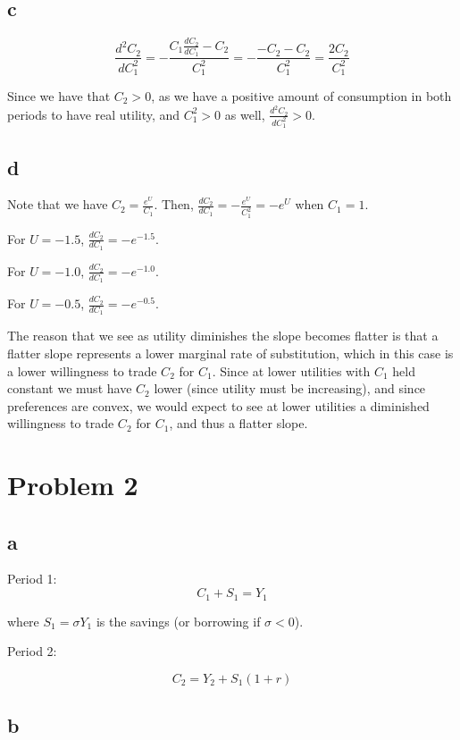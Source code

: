 \documentclass[12pt,letterpaper]{article}
\theoremstyle{definition}
\begin{document}
\subsection*{c}

\[
  \frac{d^2C_2}{dC_1^2} = -\frac{C_1\frac{dC_2}{dC_1} - C_2}{C_1^2} =
  -\frac{-C_2 - C_2}{C_1^2} = \frac{2C_2}{C_1^2}
\]

Since we have that $C_2 > 0$, as we have a positive amount of consumption in
both periods to have real utility, and $C_1^2 > 0$ as well,
$\frac{d^2C_2}{dC_1^2} > 0$.

\subsection*{d}

Note that we have $C_2 = \frac{e^{U}}{C_1}$. Then, $\frac{dC_2}{dC_1} =
-\frac{e^U}{C_1^2} = -e^U$ when $C_1 = 1$.

For $U = -1.5$, $\frac{dC_2}{dC_1} = -e^{-1.5}$.

For $U = -1.0$, $\frac{dC_2}{dC_1} = -e^{-1.0}$.

For $U = -0.5$, $\frac{dC_2}{dC_1} = -e^{-0.5}$.

The reason that we see as utility diminishes the slope becomes flatter is that a
flatter slope represents a lower marginal rate of substitution, which in this
case is a lower willingness to trade $C_2$ for $C_1$. Since at lower utilities
with $C_1$ held constant we must have $C_2$ lower (since utility must be
increasing), and since preferences are convex, we would expect to see at lower
utilities a diminished willingness to trade $C_2$ for $C_1$, and thus a flatter slope.

\section*{Problem 2}

\subsection*{a}

Period 1:
\[
  C_1 + S_1 = Y_1
\]

where $S_1 = \sigma Y_1$ is the savings (or borrowing if $\sigma < 0$).

Period 2:

\[
  C_2  = Y_2 + S_1(1 + r)
\]

\subsection*{b}
\end{document}

